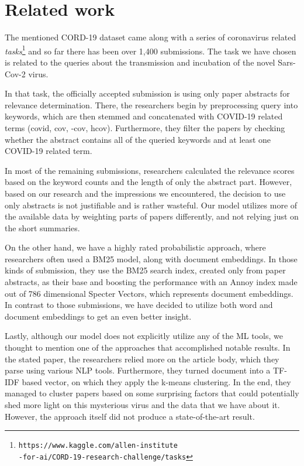 \documentclass[10pt, a4paper]{article}
\begin{document}
	\section{Related work}
	
	The mentioned CORD-19 dataset came along with a series of coronavirus related \emph{tasks}\footnote{\texttt{https://www.kaggle.com/allen-institute\\-for-ai/CORD-19-research-challenge/tasks}} and so far there has been over 1,400 submissions. The task we have chosen is related to the queries about the transmission and incubation of the novel Sars-Cov-2 virus.
	
	In that task, the officially accepted submission is using only paper abstracts for relevance determination. There, the researchers begin by preprocessing query into keywords, which are then stemmed and concatenated with COVID-19 related terms (covid, cov, -cov, hcov). Furthermore, they filter the papers by checking whether the abstract contains all of the queried keywords and at least one COVID-19 related term. 
	
	In most of the remaining submissions, researchers calculated the relevance scores based on the keyword counts and the length of only the abstract part. However, based on our research and the impressions we encountered, the decision to use only abstracts is not justifiable and is rather wasteful. Our model utilizes more of the available data by weighting parts of papers differently, and not relying just on the short summaries.
	
	On the other hand, we have a highly rated probabilistic approach, where researchers often used a BM25 model, along with document embeddings. In those kinds of submission, they use the BM25 search index, created only from paper abstracts, as their base and boosting the performance with an Annoy index made out of 786 dimensional Specter Vectors, which represents document embeddings. In contrast to those submissions, we have decided to utilize both word and document embeddings to get an even better insight. 
	
	Lastly, although our model does not explicitly utilize any of the ML tools, we thought to mention one of the approaches that accomplished notable results. In the stated paper, the researchers relied more on the article body, which they parse using various NLP tools. Furthermore, they turned document into a TF-IDF based vector, on which they apply the k-means clustering. In the end, they managed to cluster papers based on some surprising factors that could potentially shed more light on this mysterious virus and the data that we have about it. However, the approach itself did not produce a state-of-the-art result.
	
\end{document}
